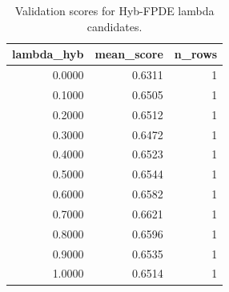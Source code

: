 \begin{table}[t]
\caption{Validation scores for Hyb-FPDE lambda candidates.}
\label{tab:lambda_distribution_computed}
\centering
\begin{tabular}{rrr}
\toprule
lambda\_hyb & mean\_score & n\_rows \\
\midrule
0.0000 & 0.6311 & 1 \\
0.1000 & 0.6505 & 1 \\
0.2000 & 0.6512 & 1 \\
0.3000 & 0.6472 & 1 \\
0.4000 & 0.6523 & 1 \\
0.5000 & 0.6544 & 1 \\
0.6000 & 0.6582 & 1 \\
0.7000 & 0.6621 & 1 \\
0.8000 & 0.6596 & 1 \\
0.9000 & 0.6535 & 1 \\
1.0000 & 0.6514 & 1 \\
\bottomrule
\end{tabular}

\end{table}
